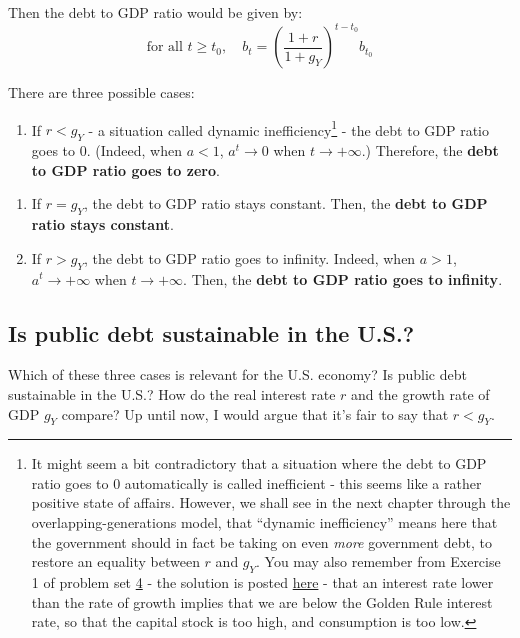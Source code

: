 \documentclass[]{book}
\providecommand{\tightlist}{%
  \setlength{\itemsep}{0pt}\setlength{\parskip}{0pt}}
\let\rmarkdownfootnote\footnote%
\def\footnote{\protect\rmarkdownfootnote}
\theoremstyle{definition}
\theoremstyle{definition}
\theoremstyle{definition}
\theoremstyle{remark}
\begin{document}
Then the debt to GDP ratio would be given by:
\[\boxed{\text{for all }t\geq t_{0},\quad b_t=\left(\frac{1+r}{1+g_Y}\right)^{t-t_{0}}b_{t_0}}\]

There are three possible cases:

\begin{enumerate}
\def\labelenumi{\arabic{enumi}.}
\tightlist
\item
  If \(r<g_Y\) - a situation called dynamic inefficiency\footnote{It
    might seem a bit contradictory that a situation where the debt to
    GDP ratio goes to 0 automatically is called inefficient - this seems
    like a rather positive state of affairs. However, we shall see in
    the next chapter through the overlapping-generations model, that
    ``dynamic inefficiency'' means here that the government should in
    fact be taking on even \emph{more} government debt, to restore an
    equality between \(r\) and \(g_Y\). You may also remember from
    Exercise 1 of problem set \protect\hyperlink{pset4}{4} - the
    solution is posted \protect\hyperlink{pset4-sol}{here} - that an
    interest rate lower than the rate of growth implies that we are
    below the Golden Rule interest rate, so that the capital stock is
    too high, and consumption is too low.} - the debt to GDP ratio goes
  to 0. (Indeed, when \(a<1\), \(a^{t}\to 0\) when \(t \to +\infty\).)
  Therefore, the \textbf{debt to GDP ratio goes to zero}.
\end{enumerate}

\begin{enumerate}
\def\labelenumi{\arabic{enumi}.}
\setcounter{enumi}{1}
\item
  If \(r=g_Y\), the debt to GDP ratio stays constant. Then, the
  \textbf{debt to GDP ratio stays constant}.
\item
  If \(r>g_Y\), the debt to GDP ratio goes to infinity. Indeed, when
  \(a>1\), \(a^{t}\to+\infty\) when \(t \to +\infty\). Then, the
  \textbf{debt to GDP ratio goes to infinity}.
\end{enumerate}

\subsection{Is public debt sustainable in the
U.S.?}\label{is-public-debt-sustainable-in-the-u.s.}

Which of these three cases is relevant for the U.S. economy? Is public
debt sustainable in the U.S.? How do the real interest rate \(r\) and
the growth rate of GDP \(g_Y\) compare? Up until now, I would argue that
it's fair to say that \(r<g_Y\).
\end{document}
